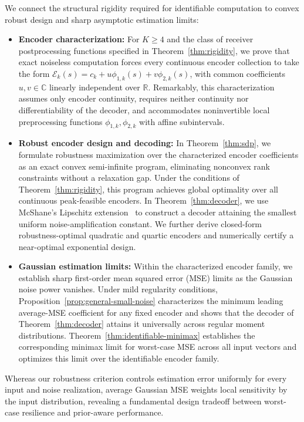 \documentclass[journal,12pt,onecolumn,draftclsnofoot]{IEEEtran}
\newcommand{\enc}{\mathscr{E}}\newcommand{\dec}{\mathscr{D}}\newcommand{\R}{\mathbb R}\newcommand{\C}{\mathbb C}
\begin{document}
We connect the structural rigidity required for identifiable computation to convex robust design and sharp asymptotic estimation limits:

\begin{itemize}
\item \textbf{Encoder characterization:} For $K\ge4$ and the class of receiver postprocessing functions specified in Theorem~\ref{thm:rigidity}, we prove that exact noiseless computation forces every continuous encoder collection to take the form $\enc_k(s)=c_k+u\phi_{1,k}(s)+v\phi_{2,k}(s)$, with common coefficients $u,v\in\C$ linearly independent over $\R$. Remarkably, this characterization assumes only encoder continuity, requires neither continuity nor differentiability of the decoder, and accommodates noninvertible local preprocessing functions $\phi_{1,k},\phi_{2,k}$ with affine subintervals.

\item \textbf{Robust encoder design and decoding:}
In Theorem~\ref{thm:sdp}, we formulate robustness maximization over the characterized encoder coefficients as an exact convex semi-infinite program, eliminating nonconvex rank constraints without a relaxation gap. Under the conditions of Theorem~\ref{thm:rigidity}, this program achieves global optimality over all continuous peak-feasible encoders. In Theorem~\ref{thm:decoder}, we use McShane's Lipschitz extension~\cite{mcshane1934} to construct a decoder attaining the smallest uniform noise-amplification constant. We further derive closed-form robustness-optimal quadratic and quartic encoders and numerically certify a near-optimal exponential design.

\item \textbf{Gaussian estimation limits:}
Within the characterized encoder family, we establish sharp first-order mean squared error (MSE) limits as the Gaussian noise power vanishes. Under mild regularity conditions, Proposition~\ref{prop:general-small-noise} characterizes the minimum leading average-MSE coefficient for any fixed encoder and shows that the decoder of Theorem~\ref{thm:decoder} attains it universally across regular moment distributions. Theorem~\ref{thm:identifiable-minimax} establishes the corresponding minimax limit for worst-case MSE across all input vectors and optimizes this limit over the identifiable encoder family.

\end{itemize}

Whereas our robustness criterion controls estimation error uniformly for every input and noise realization, average Gaussian MSE weights local sensitivity by the input distribution, revealing a fundamental design tradeoff between worst-case resilience and prior-aware performance.
\end{document}
